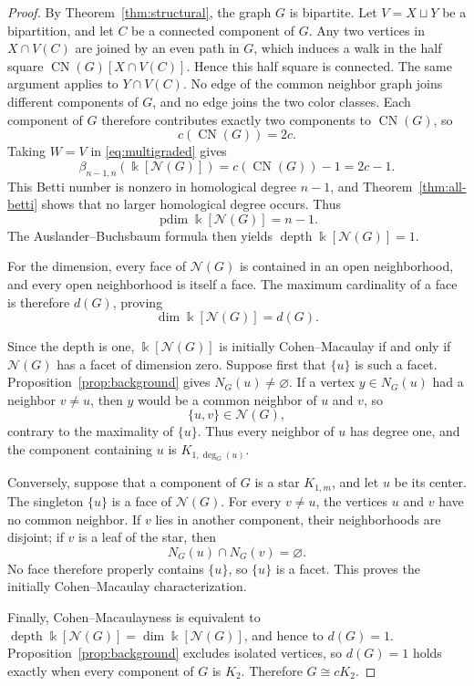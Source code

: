 \documentclass[11pt]{amsart}
\theoremstyle{definition}
\theoremstyle{remark}
\numberwithin{equation}{section}
\newcommand{\NN}{\mathcal N}
\newcommand{\CN}{\operatorname{CN}}
\newcommand{\pd}{\operatorname{pdim}}
\newcommand{\depth}{\operatorname{depth}}
\begin{document}
	\begin{proof}
		By Theorem~\ref{thm:structural}, the graph \(G\) is bipartite. Let
		\(V=X\sqcup Y\) be a bipartition, and let \(C\) be a connected component of
		\(G\). Any two vertices in \(X\cap V(C)\) are joined by an even path in
		\(G\), which induces a walk in the half square
		\(\CN(G)[X\cap V(C)]\). Hence this half square is connected. The same
		argument applies to \(Y\cap V(C)\). No edge of the common neighbor graph joins different components of \(G\),
		and no edge joins the two color classes. Each
		component of \(G\) therefore contributes exactly two components to
		\(\CN(G)\), so
		\[
		c(\CN(G))=2c.
		\]
		Taking \(W=V\) in \eqref{eq:multigraded} gives
		\[
		\beta_{n-1,n}(\Bbbk[\NN(G)])=c(\CN(G))-1=2c-1.
		\]
		This Betti number is nonzero in homological degree \(n-1\), and
		Theorem~\ref{thm:all-betti} shows that no larger homological degree occurs.
		Thus
		\[
		\pd\Bbbk[\NN(G)]=n-1.
		\]
		The Auslander--Buchsbaum formula then yields
		\(\depth\Bbbk[\NN(G)]=1\).
		
		For the dimension, every face of \(\NN(G)\) is contained in an
		open neighborhood, and every open neighborhood is itself a face. The maximum
		cardinality of a face is therefore \(d(G)\), proving
		\[
		\dim\Bbbk[\NN(G)]=d(G).
		\]
		
		Since the depth is one, \(\Bbbk[\NN(G)]\) is initially Cohen--Macaulay if
		and only if \(\NN(G)\) has a facet of dimension zero. Suppose first that
		\(\{u\}\) is such a facet. Proposition~\ref{prop:background} gives
		\(N_G(u)\ne\varnothing\). If a vertex \(y\in N_G(u)\) had a neighbor
		\(v\ne u\), then \(y\) would be a common neighbor of \(u\) and \(v\), so
		\[
		\{u,v\}\in\NN(G),
		\]
		contrary to the maximality of \(\{u\}\). Thus every neighbor of \(u\) has
		degree one, and the component containing \(u\) is
		\(K_{1,\deg_G(u)}\).
		
		Conversely, suppose that a component of \(G\) is a star \(K_{1,m}\), and let
		\(u\) be its center. The singleton \(\{u\}\) is a face of \(\NN(G)\). For
		every \(v\ne u\), the vertices \(u\) and \(v\) have no common neighbor. If
		\(v\) lies in another component, their neighborhoods are disjoint; if \(v\)
		is a leaf of the star, then
		\[
		N_G(u)\cap N_G(v)=\varnothing.
		\]
		No face therefore properly contains \(\{u\}\), so \(\{u\}\) is a facet.
		This proves the initially Cohen--Macaulay characterization.
		
		Finally, Cohen--Macaulayness is equivalent to
		\(\depth\Bbbk[\NN(G)]=\dim\Bbbk[\NN(G)]\), and hence to \(d(G)=1\).
		Proposition~\ref{prop:background} excludes isolated vertices, so \(d(G)=1\)
		holds exactly when every component of \(G\) is \(K_2\). Therefore
		\(G\cong cK_2\).
	\end{proof}
	
\end{document}
